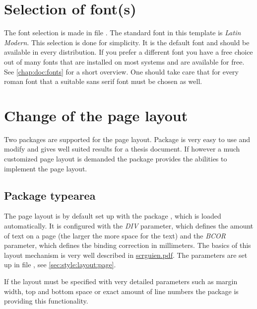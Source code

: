 \section{Selection of font(s)}
\label{sec:doc:faq:fonts}

The font selection is made in file . The standard font in this template is \emph{Latin Modern}. This selection is done for simplicity. It is the default \latex font and should be available in every distribution. If you prefer a different font you have a free choice out of many fonts that are installed on most systems and are available for free. See \cref{chap:doc:fonts} for a short overview. One should take care that for every roman font that a suitable sans serif font must be chosen as well.

\section{Change of the page layout}
\label{sec:doc:faq:pagelayout}

Two packages are supported for the page layout. Package  is very easy to use and modify and gives well suited results for a thesis document. If however a much customized page layout is demanded the package  provides the abilities to implement the page layout.

\subsection{Package typearea}
The page layout is by default set up with the package , which is loaded automatically. It is configured with the \emph{DIV} parameter, which defines the amount of text on a page (the larger the more space for the text) and the \emph{BCOR} parameter, which defines the binding correction in millimeters. The basics of this layout mechanism is very well described in \href{http://mirrors.ctan.org/macros/latex/contrib/koma-script/doc/scrguien.pdf}{scrguien.pdf}. The parameters are set up in file , see \cref{sec:style:layout:page}.

If the layout must be specified with very detailed parameters such as margin width, top and bottom space or exact amount of line numbers the package  is providing this functionality.

